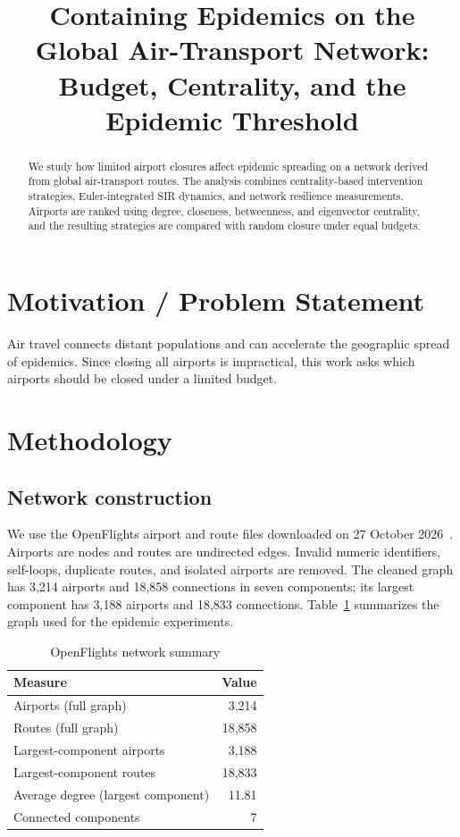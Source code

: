 \documentclass[conference]{IEEEtran}
\title{Containing Epidemics on the Global Air-Transport Network:\\
Budget, Centrality, and the Epidemic Threshold}
\author{
\IEEEauthorblockN{Krish Dhola, Prince Sojitra, Jenish Vasani}
\IEEEauthorblockA{Group 22\\
202301189, 202301126, 202301057}
}
\begin{document}
\maketitle

\begin{abstract}
We study how limited airport closures affect epidemic spreading on a
network derived from global air-transport routes. The analysis combines
centrality-based intervention strategies, Euler-integrated SIR dynamics,
and network resilience measurements. Airports are ranked using degree,
closeness, betweenness, and eigenvector centrality, and the resulting
strategies are compared with random closure under equal budgets.
\end{abstract}

\section{Motivation / Problem Statement}
Air travel connects distant populations and can accelerate the geographic
spread of epidemics. Since closing all airports is impractical, this work
asks which airports should be closed under a limited budget.
\cite{keeling2005,pastorsatorras2015}

\section{Methodology}
\subsection{Network construction}
We use the OpenFlights airport and route files downloaded on 27 October
2026~\cite{openflights}. Airports are nodes and routes are undirected edges. Invalid numeric
identifiers, self-loops, duplicate routes, and isolated airports are
removed. The cleaned graph has 3,214 airports and 18,858 connections in
seven components; its largest component has 3,188 airports and 18,833
connections. Table~\ref{tab:network} summarizes the graph used for the
epidemic experiments.

\begin{table}[t]
\caption{OpenFlights network summary}
\label{tab:network}
\centering
\begin{tabular}{lr}
\toprule
Measure & Value\\
\midrule
Airports (full graph) & 3,214\\
Routes (full graph) & 18,858\\
Largest-component airports & 3,188\\
Largest-component routes & 18,833\\
Average degree (largest component) & 11.81\\
Connected components & 7\\
\bottomrule
\end{tabular}
\end{table}
\end{document}
